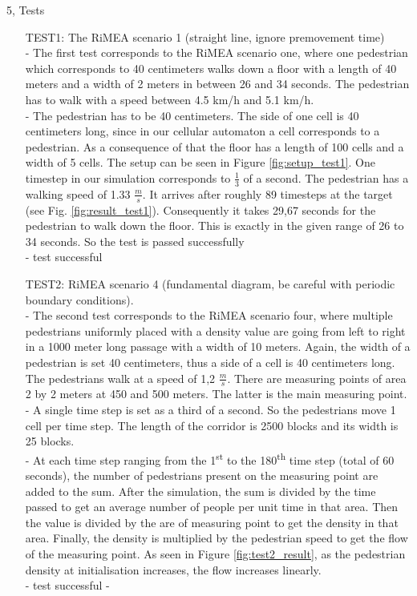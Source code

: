 \documentclass[10pt,a4paper]{article}
\begin{document}
\begin{task}{5, Tests}
\begin{enumerate}
\item[TEST1:] The RiMEA scenario 1 (straight line, ignore premovement time)\\
- The first test corresponds to the RiMEA scenario one, where one pedestrian which corresponds to 40 centimeters walks down a floor with a length of 40 meters and a width of 2 meters in between 26 and 34 seconds. The pedestrian has to walk with a speed between 4.5 km/h and 5.1 km/h. \\
- The pedestrian has to be 40 centimeters. The side of one cell is 40 centimeters long, since in our cellular automaton a cell corresponds to a pedestrian. As a consequence of that the floor has a length of 100 cells and a width of 5 cells. The setup can be seen in Figure \ref{fig:setup_test1}. One timestep in our simulation corresponds to $\frac{1}{3}$ of a second. The pedestrian has a walking speed of 1.33 $\frac{m}{s}$. It arrives after roughly 89 timesteps at the target (see Fig. \ref{fig:result_test1}). Consequently it takes 29,67 seconds for the pedestrian to walk down the floor. This is exactly in the given range of 26 to 34 seconds. So the test is passed successfully \\
- test successful
\item[TEST2:] RiMEA scenario 4 (fundamental diagram, be careful with periodic boundary conditions).\\
- The second test corresponds to the RiMEA scenario four, where multiple pedestrians uniformly placed with a density value are going from left to right in a 1000 meter long passage with a width of 10 meters. Again, the width of a pedestrian is set 40 centimeters, thus a side of a cell is 40 centimeters long. The pedestrians walk at a speed of 1,2 $\frac{m}{s}$. There are measuring points of area 2 by 2 meters at 450 and 500 meters. The latter is the main measuring point. \\
- A single time step is set as a third of a second. So the pedestrians move 1 cell per time step. The length of the corridor is 2500 blocks and its width is 25 blocks. \\
- At each time step ranging from the 1\textsuperscript{st} to the 180\textsuperscript{th} time step (total of 60 seconds), the number of pedestrians present on the measuring point are added to the sum. After the simulation, the sum is divided by the time passed to get an average number of people per unit time in that area. Then the value is divided by the are of measuring point to get the density in that area. Finally, the density is multiplied by the pedestrian speed to get the flow of the measuring point. As seen in Figure \ref{fig:test2_result}, as the pedestrian density at initialisation increases, the flow increases linearly. \\
- test successful - \\


\end{enumerate}
\end{task}
\end{document}
